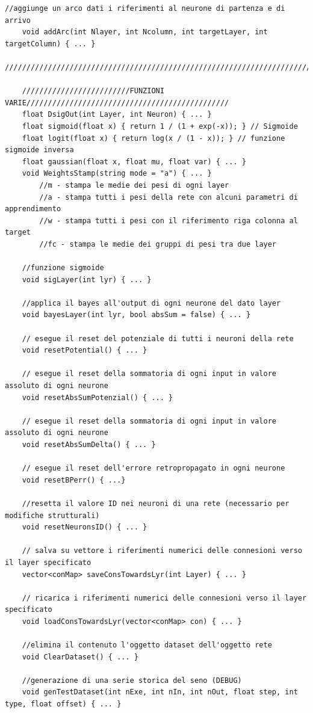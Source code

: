 \documentclass[10pt,a4paper]{article}
\begin{document}
\begin{lstlisting}[style=mycuda, caption=class Network, captionpos=b]
	//aggiunge un arco dati i riferimenti al neurone di partenza e di arrivo
	void addArc(int Nlayer, int Ncolumn, int targetLayer, int targetColumn) { ... }
	//////////////////////////////////////////////////////////////////////////////////////
	
	/////////////////////////FUNZIONI VARIE///////////////////////////////////////////////
	float DsigOut(int Layer, int Neuron) { ... }
	float sigmoid(float x) { return 1 / (1 + exp(-x)); } // Sigmoide
	float logit(float x) { return log(x / (1 - x)); } // funzione sigmoide inversa 
	float gaussian(float x, float mu, float var) { ... }
	void WeightsStamp(string mode = "a") { ... }
		//m - stampa le medie dei pesi di ogni layer
		//a - stampa tutti i pesi della rete con alcuni parametri di apprendimento
		//w - stampa tutti i pesi con il riferimento riga colonna al target
		//fc - stampa le medie dei gruppi di pesi tra due layer 	
		
	//funzione sigmoide	
	void sigLayer(int lyr) { ... }
	
	//applica il bayes all'output di ogni neurone del dato layer
	void bayesLayer(int lyr, bool absSum = false) { ... }
	
	// esegue il reset del potenziale di tutti i neuroni della rete
	void resetPotential() { ... }
	
	// esegue il reset della sommatoria di ogni input in valore assoluto di ogni neurone
	void resetAbsSumPotenzial() { ... }
	
	// esegue il reset della sommatoria di ogni input in valore assoluto di ogni neurone
	void resetAbsSumDelta() { ... }
	
	// esegue il reset dell'errore retropropagato in ogni neurone
	void resetBPerr() { ...}
	
	//resetta il valore ID nei neuroni di una rete (necessario per modifiche strutturali)	
	void resetNeuronsID() { ... }
	
	// salva su vettore i riferimenti numerici delle connesioni verso il layer specificato
	vector<conMap> saveConsTowardsLyr(int Layer) { ... }
	
	// ricarica i riferimenti numerici delle connesioni verso il layer specificato	
	void loadConsTowardsLyr(vector<conMap> con) { ... } 
	
	//elimina il contenuto l'oggetto dataset dell'oggetto rete
	void ClearDataset() { ... }
	
	//generazione di una serie storica del seno (DEBUG)
	void genTestDataset(int nExe, int nIn, int nOut, float step, int type, float offset) { ... }
	

\end{lstlisting}
\end{document}
